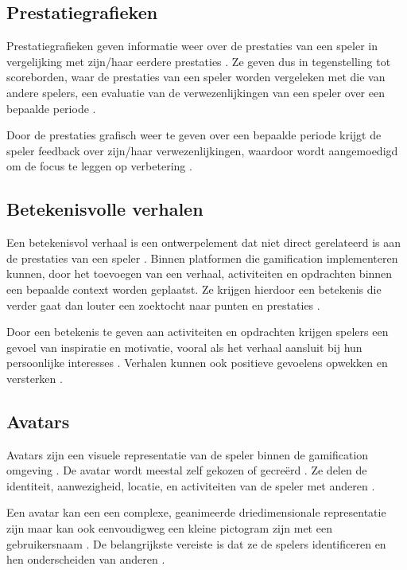 \subsection{Prestatiegrafieken}

Prestatiegrafieken geven informatie weer over de prestaties van een speler in vergelijking met zijn/haar eerdere prestaties \autocite{Sailer2013}. Ze geven dus in tegenstelling tot scoreborden, waar de prestaties van een speler worden vergeleken met die van andere spelers, een evaluatie van de verwezenlijkingen van een speler over een bepaalde periode \autocite{Sailer2016}.
 
Door de prestaties grafisch weer te geven over een bepaalde periode krijgt de speler feedback over zijn/haar verwezenlijkingen, waardoor wordt aangemoedigd om de focus te leggen op verbetering \autocite{Sailer2013}.

\subsection{Betekenisvolle verhalen}

Een betekenisvol verhaal is een ontwerpelement dat niet direct gerelateerd is aan de prestaties van een speler \autocite{Sailer2016}. Binnen platformen die gamification implementeren kunnen, door het toevoegen van een verhaal, activiteiten en opdrachten binnen een bepaalde context worden geplaatst. Ze krijgen hierdoor een betekenis die verder gaat dan louter een zoektocht naar punten en prestaties \autocite{Kapp2012}.

Door een betekenis te geven aan activiteiten en opdrachten krijgen spelers een gevoel van inspiratie en motivatie, vooral als het verhaal aansluit bij hun persoonlijke interesses \autocite{Sailer2016}. Verhalen kunnen ook positieve gevoelens opwekken en versterken \autocite{Sailer2013}.

\subsection{Avatars}

Avatars zijn een visuele representatie van de speler binnen de gamification omgeving \autocite{Sailer2016}. De avatar wordt meestal zelf gekozen of gecreërd \autocite{Kapp2012}. Ze delen de identiteit, aanwezigheid, locatie, en activiteiten van de speler met anderen \autocite{Annetta2010}.

Een avatar kan een een complexe, geanimeerde driedimensionale representatie zijn \autocite{Sailer2016} maar kan ook eenvoudigweg een kleine pictogram zijn met een gebruikersnaam \autocite{Zichermann2011}. De belangrijkste vereiste is dat ze de spelers identificeren en hen onderscheiden van anderen \autocite{Sailer2016}.

